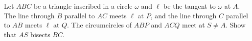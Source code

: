 Let $ABC$ be a triangle inscribed in a circle $\omega$ and $\ell$ be the tangent to $\omega$ at $A$. The line through $B$ parallel to $AC$ meets $\ell$ at $P$, and the line through $C$ parallel to $AB$ meets $\ell$ at $Q$. The circumcircles of $ABP$ and $ACQ$ meet at $S\neq A$. Show that $AS$ bisects $BC$.

